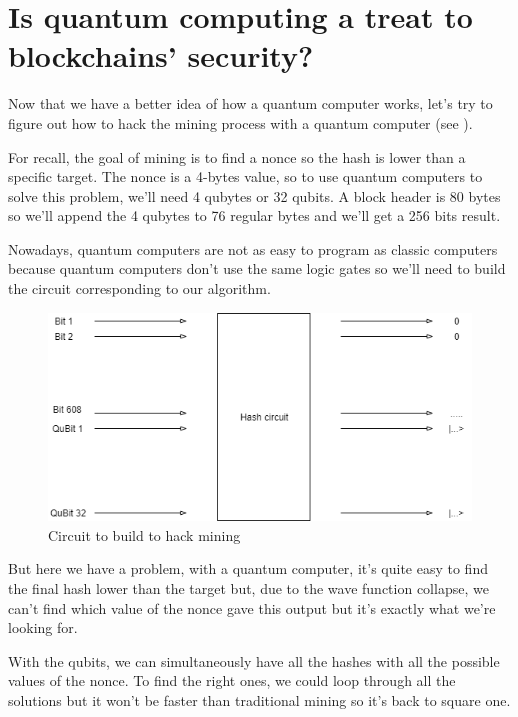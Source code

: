 \section{Is quantum computing a treat to blockchains' security?}

Now that we have a better idea of how a quantum computer works, let's try to figure out how to hack the mining process with a quantum computer (see \cite{quantum_computer}). \newline

For recall, the goal of mining is to find a nonce so the hash is lower than a specific target. The nonce is a 4-bytes value, so to use quantum computers to solve this problem, we'll need 4 qubytes or 32 qubits. A block header is 80 bytes so we'll append the 4 qubytes to 76 regular bytes and we'll get a 256 bits result.\newline

Nowadays, quantum computers are not as easy to program as classic computers because quantum computers don't use the same logic gates so we'll need to build the circuit corresponding to our algorithm.

\clearpage

\begin{figure}[ht]
\centering
\includegraphics[width=12cm]{Figures/hashCircuit}
\caption{Circuit to build to hack mining}
\end{figure}
\medskip

But here we have a problem, with a quantum computer, it's quite easy to find the final hash lower than the target but, due to the wave function collapse, we can't find which value of the nonce gave this output but it's exactly what we're looking for. \newline

With the qubits, we can simultaneously have all the hashes with all the possible values of the nonce. To find the right ones, we could loop through all the solutions but it won't be faster than traditional mining so it's back to square one.

